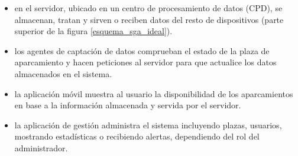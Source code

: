 \begin{itemize}
	\item en el servidor, ubicado en un centro de procesamiento de datos (CPD), se almacenan, tratan y sirven o reciben datos del resto de dispositivos (parte superior de la figura \ref{esquema_sga_ideal}).
	\item los agentes de captación de datos comprueban el estado de la plaza de aparcamiento y hacen peticiones al servidor para que actualice los datos almacenados en el sistema.
	\item la aplicación móvil muestra al usuario la disponibilidad de los aparcamientos en base a la información almacenada y servida por el servidor.
	\item la aplicación de gestión administra el sistema incluyendo plazas, usuarios, mostrando estadísticas o recibiendo alertas, dependiendo del rol del administrador.
\end{itemize}
